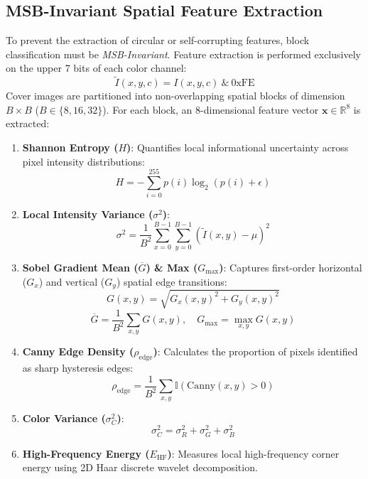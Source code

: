 \documentclass[conference]{IEEEtran}
\begin{document}
\subsection{MSB-Invariant Spatial Feature Extraction}
To prevent the extraction of circular or self-corrupting features, block classification must be \textit{MSB-Invariant}. Feature extraction is performed exclusively on the upper 7 bits of each color channel:
\begin{equation}
    \tilde{I}(x, y, c) = I(x, y, c) \ \& \ \text{0xFE}
\end{equation}
Cover images are partitioned into non-overlapping spatial blocks of dimension $B \times B$ ($B \in \{8, 16, 32\}$). For each block, an 8-dimensional feature vector $\mathbf{x} \in \mathbb{R}^8$ is extracted:
\begin{enumerate}
    \item \textbf{Shannon Entropy ($H$)}: Quantifies local informational uncertainty across pixel intensity distributions:
    \begin{equation}
        H = -\sum_{i=0}^{255} p(i) \log_2(p(i) + \epsilon)
    \end{equation}
    \item \textbf{Local Intensity Variance ($\sigma^2$)}:
    \begin{equation}
        \sigma^2 = \frac{1}{B^2} \sum_{x=0}^{B-1} \sum_{y=0}^{B-1} (\tilde{I}(x, y) - \mu)^2
    \end{equation}
    \item \textbf{Sobel Gradient Mean ($\overline{G}$) \& Max ($G_{\max}$)}: Captures first-order horizontal ($G_x$) and vertical ($G_y$) spatial edge transitions:
    \begin{equation}
        G(x, y) = \sqrt{G_x(x, y)^2 + G_y(x, y)^2}
    \end{equation}
    \begin{equation}
        \overline{G} = \frac{1}{B^2} \sum_{x,y} G(x, y), \quad G_{\max} = \max_{x,y} G(x, y)
    \end{equation}
    \item \textbf{Canny Edge Density ($\rho_{\text{edge}}$)}: Calculates the proportion of pixels identified as sharp hysteresis edges:
    \begin{equation}
        \rho_{\text{edge}} = \frac{1}{B^2} \sum_{x,y} \mathbb{I}(\text{Canny}(x, y) > 0)
    \end{equation}
    \item \textbf{Color Variance ($\sigma_C^2$)}:
    \begin{equation}
        \sigma_C^2 = \sigma_R^2 + \sigma_G^2 + \sigma_B^2
    \end{equation}
    \item \textbf{High-Frequency Energy ($E_{\text{HF}}$)}: Measures local high-frequency corner energy using 2D Haar discrete wavelet decomposition.
\end{enumerate}
\end{document}
